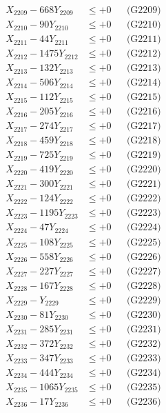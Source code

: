 \documentclass[a4paper,10pt]{article}
\begin{document}
{\begin{align}
X_{2209} - 668Y_{2209} &\leq +0 && \text{(G2209)} \\
X_{2210} - 90Y_{2210} &\leq +0 && \text{(G2210)} \\
\allowbreak
X_{2211} - 44Y_{2211} &\leq +0 && \text{(G2211)} \\
X_{2212} - 1475Y_{2212} &\leq +0 && \text{(G2212)} \\
X_{2213} - 132Y_{2213} &\leq +0 && \text{(G2213)} \\
X_{2214} - 506Y_{2214} &\leq +0 && \text{(G2214)} \\
X_{2215} - 112Y_{2215} &\leq +0 && \text{(G2215)} \\
X_{2216} - 205Y_{2216} &\leq +0 && \text{(G2216)} \\
X_{2217} - 274Y_{2217} &\leq +0 && \text{(G2217)} \\
X_{2218} - 459Y_{2218} &\leq +0 && \text{(G2218)} \\
X_{2219} - 725Y_{2219} &\leq +0 && \text{(G2219)} \\
X_{2220} - 419Y_{2220} &\leq +0 && \text{(G2220)} \\
\allowbreak
X_{2221} - 300Y_{2221} &\leq +0 && \text{(G2221)} \\
X_{2222} - 124Y_{2222} &\leq +0 && \text{(G2222)} \\
X_{2223} - 1195Y_{2223} &\leq +0 && \text{(G2223)} \\
X_{2224} - 47Y_{2224} &\leq +0 && \text{(G2224)} \\
X_{2225} - 108Y_{2225} &\leq +0 && \text{(G2225)} \\
X_{2226} - 558Y_{2226} &\leq +0 && \text{(G2226)} \\
X_{2227} - 227Y_{2227} &\leq +0 && \text{(G2227)} \\
X_{2228} - 167Y_{2228} &\leq +0 && \text{(G2228)} \\
X_{2229} - Y_{2229} &\leq +0 && \text{(G2229)} \\
X_{2230} - 81Y_{2230} &\leq +0 && \text{(G2230)} \\
\allowbreak
X_{2231} - 285Y_{2231} &\leq +0 && \text{(G2231)} \\
X_{2232} - 372Y_{2232} &\leq +0 && \text{(G2232)} \\
X_{2233} - 347Y_{2233} &\leq +0 && \text{(G2233)} \\
X_{2234} - 444Y_{2234} &\leq +0 && \text{(G2234)} \\
X_{2235} - 1065Y_{2235} &\leq +0 && \text{(G2235)} \\
X_{2236} - 17Y_{2236} &\leq +0 && \text{(G2236)} \\

\end{align}}
\end{document}
